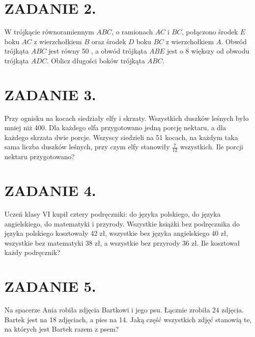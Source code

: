 \documentclass[10pt]{article}
\begin{document}
\section*{ZADANIE 2.}
W trójkącie równoramiennym \(A B C\), o ramionach \(A C\) i \(B C\), połączono środek \(E\) boku \(A C\) z wierzchołkiem \(B\) oraz środek \(D\) boku \(B C\) z wierzchołkiem \(A\). Obwód trójkąta \(A B C\) jest równy 50 , a obwód trójkąta \(A B E\) jest o 8 większy od obwodu trójkąta \(A D C\). Oblicz długości boków trójkąta \(A B C\).

\section*{ZADANIE 3.}
Przy ognisku na kocach siedziały elfy i skrzaty. Wszystkich duszków leśnych było mniej niż 400. Dla każdego elfa przygotowano jedną porcję nektaru, a dla każdego skrzata dwie porcje. Wszyscy siedzieli na 51 kocach, na każdym taka sama liczba duszków leśnych, przy czym elfy stanowiły \(\frac{7}{12}\) wszystkich. Ile porcji nektaru przygotowano?

\section*{ZADANIE 4.}
Uczeń klasy VI kupił cztery podręczniki: do języka polskiego, do języka angielskiego, do matematyki i przyrody. Wszystkie książki bez podręcznika do języka polskiego kosztowały 42 zł, wszystkie bez języka angielskiego 40 zł, wszystkie bez matematyki 38 zł, a wszystkie bez przyrody 36 zł. Ile kosztował każdy podręcznik?

\section*{ZADANIE 5.}
Na spacerze Ania robiła zdjęcia Bartkowi i jego psu. Łącznie zrobiła 24 zdjęcia. Bartek jest na 18 zdjęciach, a pies na 14. Jaką część wszystkich zdjęć stanowią te, na których jest Bartek razem z psem?
\end{document}
